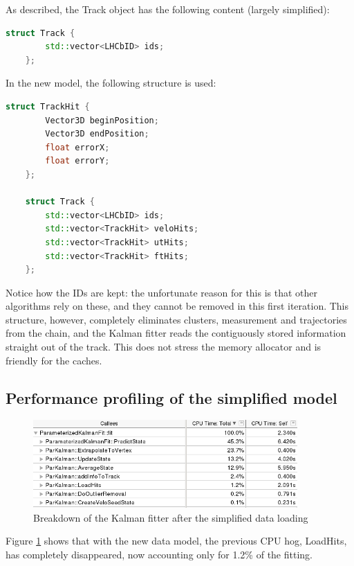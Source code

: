 \documentclass[12pt]{article}
\begin{document}
As described, the Track object has the following content (largely simplified):
\begin{lstlisting}[language=C++]
	struct Track {
		std::vector<LHCbID> ids;
	};
\end{lstlisting}

In the new model, the following structure is used:
\begin{lstlisting}[language=C++]
	struct TrackHit {
		Vector3D beginPosition;
		Vector3D endPosition;
		float errorX;
		float errorY;
	};
	
	struct Track {
		std::vector<LHCbID> ids;
		std::vector<TrackHit> veloHits;
		std::vector<TrackHit> utHits;
		std::vector<TrackHit> ftHits;
	};
\end{lstlisting}

Notice how the IDs are kept: the unfortunate reason for this is that other algorithms rely on these, and they cannot be removed in this first iteration. This structure, however, completely eliminates clusters, measurement and trajectories from the chain, and the Kalman fitter reads the contiguously stored information straight out of the track. This does not stress the memory allocator and is friendly for the caches.


\subsection{Performance profiling of the simplified model}

\begin{figure}[H]
	\begin{center}
		\includegraphics[width=0.9\textwidth]{kalmanfit_simplified_overall_breakdown}
	\end{center}
	\caption[CPU hotspots of the Kalman fitter after optimization]{Breakdown of the Kalman fitter after the simplified data loading}
	\label{fig_kalmanfit_simplified_overall_breakdown}
\end{figure}

Figure \ref{fig_kalmanfit_simplified_overall_breakdown} shows that with the new data model, the previous CPU hog, LoadHits, has completely disappeared, now accounting only for 1.2\% of the fitting.
\end{document}
